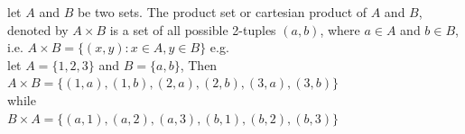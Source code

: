 \begin{para}
    let $A$ and $B$ be two sets. The product set or cartesian product of $A$ and $B$, denoted by $A \times B$ is a set of all possible 2-tuples $(a,b)$, where $a \in A$ and $b \in B$, i.e. $A \times B = \{(x,y): x \in A, y \in B\}$ e.g. \\
    let $A=\{1,2,3\}$ and $B=\{a,b\}$, Then \\
    $A \times B = \{(1,a),(1,b),(2,a),(2,b),(3,a),(3,b)\}$\\
    while\\
    $B \times A = \{(a,1),(a,2),(a,3),(b,1),(b,2),(b,3)\}$
\end{para}

